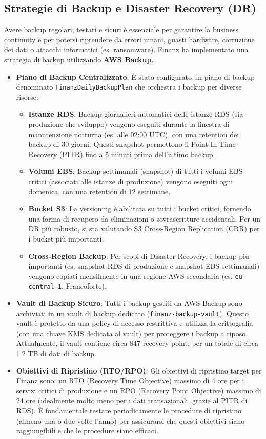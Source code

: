 \subsection{Strategie di Backup e Disaster Recovery (DR)}
\label{subsec:backup-dr_cap2}
Avere backup regolari, testati e sicuri è essenziale per garantire la business continuity e per potersi riprendere da errori umani, guasti hardware, corruzione dei dati o attacchi informatici (es. ransomware). Finanz ha implementato una strategia di backup utilizzando \textbf{AWS Backup}.
\begin{itemize}
    \item \textbf{Piano di Backup Centralizzato}: È stato configurato un piano di backup denominato \texttt{FinanzDailyBackupPlan} che orchestra i backup per diverse risorse:
        \begin{itemize}
            \item \textbf{Istanze RDS}: Backup giornalieri automatici delle istanze RDS (sia produzione che sviluppo) vengono eseguiti durante la finestra di manutenzione notturna (es. alle 02:00 UTC), con una retention dei backup di 30 giorni. Questi snapshot permettono il Point-In-Time Recovery (PITR) fino a 5 minuti prima dell'ultimo backup.
            \item \textbf{Volumi EBS}: Backup settimanali (snapshot) di tutti i volumi EBS critici (associati alle istanze di produzione) vengono eseguiti ogni domenica, con una retention di 12 settimane.
            \item \textbf{Bucket S3}: La versioning è abilitata su tutti i bucket critici, fornendo una forma di recupero da eliminazioni o sovrascritture accidentali. Per un DR più robusto, si sta valutando S3 Cross-Region Replication (CRR) per i bucket più importanti.
            \item \textbf{Cross-Region Backup}: Per scopi di Disaster Recovery, i backup più importanti (es. snapshot RDS di produzione e snapshot EBS settimanali) vengono copiati mensilmente in una regione AWS secondaria (es. \texttt{eu-central-1}, Francoforte).
        \end{itemize}
    \item \textbf{Vault di Backup Sicuro}: Tutti i backup gestiti da AWS Backup sono archiviati in un vault di backup dedicato (\texttt{finanz-backup-vault}). Questo vault è protetto da una policy di accesso restrittiva e utilizza la crittografia (con una chiave KMS dedicata al vault) per proteggere i backup a riposo. Attualmente, il vault contiene circa 847 recovery point, per un totale di circa 1.2 TB di dati di backup.
    \item \textbf{Obiettivi di Ripristino (RTO/RPO)}: Gli obiettivi di ripristino target per Finanz sono: un RTO (Recovery Time Objective) massimo di 4 ore per i servizi critici di produzione e un RPO (Recovery Point Objective) massimo di 24 ore (idealmente molto meno per i dati transazionali, grazie al PITR di RDS). È fondamentale testare periodicamente le procedure di ripristino (almeno una o due volte l'anno) per assicurarsi che questi obiettivi siano raggiungibili e che le procedure siano efficaci.
\end{itemize}

